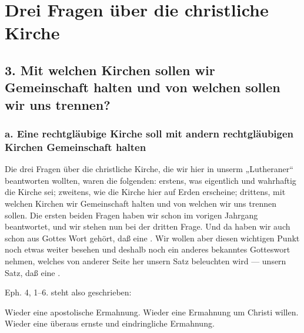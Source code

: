 \chapter{Drei Fragen über die christliche Kirche}

\section[3. Mit welchen Kirchen sollen wir Gemeinschaft halten?]{3. Mit welchen Kirchen sollen wir Gemeinschaft halten und von welchen sollen wir uns trennen?}

\subsection[a. Gemeinschaft rechtgläubiger Kirchen]{a. Eine rechtgläubige Kirche soll mit andern rechtgläubigen Kirchen Gemeinschaft halten}

Die drei Fragen über die christliche Kirche, die wir hier in unserm „Lutheraner“ beantworten wollten, waren die folgenden: erstens, was eigentlich und wahrhaftig die Kirche sei; zweitens, wie die Kirche hier auf Erden erscheine; drittens, mit welchen Kirchen wir Gemeinschaft halten und von welchen wir uns trennen sollen. Die ersten beiden Fragen haben wir schon im vorigen Jahrgang beantwortet, und wir stehen nun bei der dritten Frage. Und da haben wir auch schon aus Gottes Wort gehört, daß eine . Wir wollen aber diesen wichtigen Punkt noch etwas weiter besehen und deshalb noch ein anderes bekanntes Gotteswort nehmen, welches von anderer Seite her unsern Satz beleuchten wird — unsern Satz, daß eine .

Eph. 4, 1–6. steht also geschrieben: 

Wieder eine apostolische Ermahnung. Wieder eine Ermahnung um Christi willen. Wieder eine überaus ernste und eindringliche Ermahnung.

